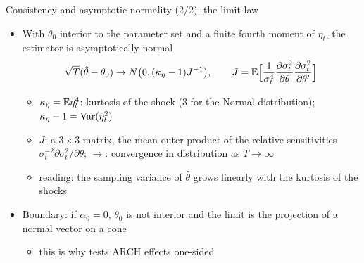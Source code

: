 \begin{frame}{Consistency and asymptotic normality (2/2): the limit law}
\itemsize{\small}
\begin{itemize}
    \item With $\theta_0$ interior to the parameter set and a finite fourth moment of $\eta_t$, the estimator is asymptotically normal
    \[ \sqrt T(\hat\theta - \theta_0) \to N\big(0, (\kappa_\eta - 1)J^{-1}\big), \qquad J = \mathbb{E}\Big[\frac{1}{\sigma^4_t}\frac{\partial\sigma^2_t}{\partial\theta}\frac{\partial\sigma^2_t}{\partial\theta'}\Big] \]
    \begin{itemize}
        \item $\kappa_\eta = \mathbb{E}\eta_t^4$: kurtosis of the shock ($3$ for the Normal distribution); $\kappa_\eta - 1 = \text{Var}(\eta_t^2)$
        \item $J$: a $3 \times 3$ matrix, the mean outer product of the relative sensitivities $\sigma_t^{-2}\partial\sigma^2_t/\partial\theta$; $\to$: convergence in distribution as $T \to \infty$
        \item reading: the sampling variance of $\hat\theta$ grows linearly with the kurtosis of the shocks
    \end{itemize}
    \item Boundary: if $\alpha_0 = 0$, $\theta_0$ is not interior and the limit is the projection of a normal vector on a cone
    \begin{itemize}
        \item this is why  tests ARCH effects one-sided
    \end{itemize}
\end{itemize}
\end{frame}

